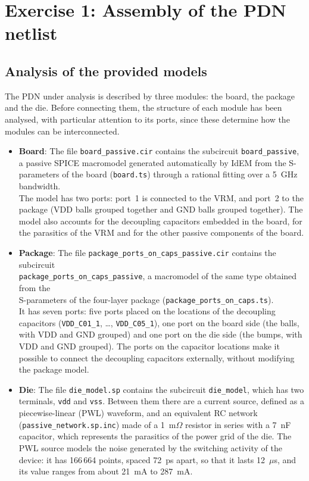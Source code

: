 \section{Exercise 1: Assembly of the PDN netlist}


\subsection{Analysis of the provided models}

The PDN under analysis is described by three modules: the board, the package and the die. Before connecting them, the structure of each module has
been analysed, with particular attention to its ports, since these determine how the modules can be interconnected.

\begin{itemize}
    \item \textbf{Board}: The file \texttt{board\_passive.cir} contains the subcircuit \texttt{board\_passive}, a passive SPICE macromodel generated
    automatically by IdEM from the S-parameters of the board (\texttt{board.ts}) through a rational fitting over a 5~GHz bandwidth.\\ The model has two
    ports: port~1 is connected to the VRM, and port~2 to the package (VDD balls grouped together and GND balls grouped together). The model also
    accounts for the decoupling capacitors embedded in the board, for the parasitics of the VRM and for the other passive components of the board.
    \item \textbf{Package}: The file \texttt{package\_ports\_on\_caps\_passive.cir} contains the subcircuit\\
    \texttt{package\_ports\_on\_caps\_passive}, a macromodel of the same type obtained from the\\ S-parameters of the four-layer package
    (\texttt{package\_ports\_on\_caps.ts}).\\ It has seven ports: five ports placed on the locations of the decoupling capacitors
    (\texttt{VDD\_C01\_1}, \dots, \texttt{VDD\_C05\_1}), one port on the board side (the balls, with VDD and GND grouped) and one port on the die
    side (the bumps, with VDD and GND grouped). The ports on the capacitor locations make it possible to connect the decoupling capacitors externally,
    without modifying the package model.
    \item \textbf{Die}: The file \texttt{die\_model.sp} contains the subcircuit \texttt{die\_model}, which has two terminals, \texttt{vdd} and
    \texttt{vss}. Between them there are a current source, defined as a piecewise-linear (PWL) waveform, and an equivalent RC network
    (\texttt{passive\_network.sp.inc}) made of a 1~m$\Omega$ resistor in series with a 7~nF capacitor, which represents the parasitics of the power
    grid of the die. The PWL source models the noise generated by the switching activity of the device: it has 166\,664 points, spaced 72~ps apart,
    so that it lasts 12~$\mu$s, and its value ranges from about 21~mA to 287~mA.
\end{itemize}

